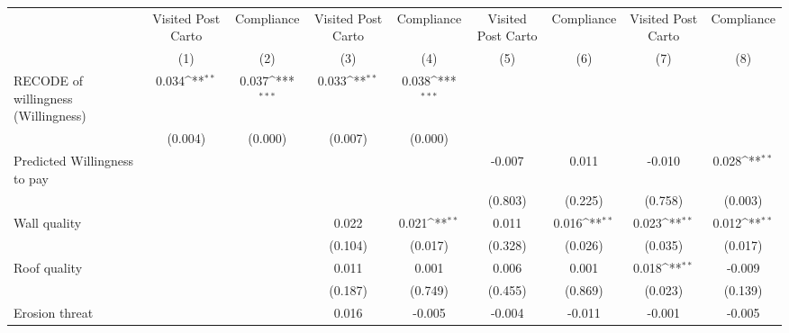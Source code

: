 {
\def\sym#1{\ifmmode^{#1}\else\(^{#1}\)\fi}
\begin{tabular}{l*{8}{c}}
\toprule
                &\multicolumn{1}{c}{Visited Post Carto}&\multicolumn{1}{c}{Compliance}&\multicolumn{1}{c}{Visited Post Carto}&\multicolumn{1}{c}{Compliance}&\multicolumn{1}{c}{Visited Post Carto}&\multicolumn{1}{c}{Compliance}&\multicolumn{1}{c}{Visited Post Carto}&\multicolumn{1}{c}{Compliance}\\
                &\multicolumn{1}{c}{(1)}         &\multicolumn{1}{c}{(2)}         &\multicolumn{1}{c}{(3)}         &\multicolumn{1}{c}{(4)}         &\multicolumn{1}{c}{(5)}         &\multicolumn{1}{c}{(6)}         &\multicolumn{1}{c}{(7)}         &\multicolumn{1}{c}{(8)}         \\
\midrule
RECODE of willingness (Willingness)&    0.034\sym{**} &    0.037\sym{***}&    0.033\sym{**} &    0.038\sym{***}&                  &                  &                  &                  \\
                &  (0.004)         &  (0.000)         &  (0.007)         &  (0.000)         &                  &                  &                  &                  \\
Predicted Willingness to pay&                  &                  &                  &                  &   -0.007         &    0.011         &   -0.010         &    0.028\sym{**} \\
                &                  &                  &                  &                  &  (0.803)         &  (0.225)         &  (0.758)         &  (0.003)         \\
Wall quality    &                  &                  &    0.022         &    0.021\sym{**} &    0.011         &    0.016\sym{**} &    0.023\sym{**} &    0.012\sym{**} \\
                &                  &                  &  (0.104)         &  (0.017)         &  (0.328)         &  (0.026)         &  (0.035)         &  (0.017)         \\
Roof quality    &                  &                  &    0.011         &    0.001         &    0.006         &    0.001         &    0.018\sym{**} &   -0.009         \\
                &                  &                  &  (0.187)         &  (0.749)         &  (0.455)         &  (0.869)         &  (0.023)         &  (0.139)         \\
Erosion threat  &                  &                  &    0.016         &   -0.005         &   -0.004         &   -0.011         &   -0.001         &   -0.005         \\

\end{tabular}}
